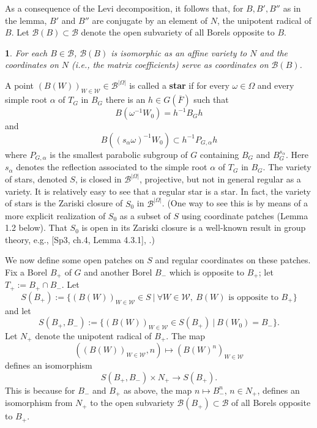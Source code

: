 \documentclass[12pt,letterpaper]{amsart}
\newcommand{\proclaimname}{}
\newtheorem*{proclaimx}{\proclaimname}
\newenvironment{proclaim}[1]%
  {\renewcommand{\proclaimname}{#1}\begin{proclaimx}}{\end{proclaimx}}
\begin{document}
As a consequence of the Levi decomposition,
it follows that, for $B, B',B''$ as in the lemma,
$B'$ and $B''$ are conjugate by an element of $N$, the unipotent radical of
$B$. Let ${\mathcal B}(B)\subset {\mathcal B}$
denote the open subvariety of all Borels
opposite to $B$.

\begin{proclaim}{Corollary 1.6} For each $B\in {\mathcal B}$, ${\mathcal B}(B)$
is isomorphic
as an affine variety to $N$ and the coordinates on $N$ (i.e., the matrix
coefficients) serve as coordinates on ${\mathcal B}(B)$.
\end{proclaim}

A point
$(B(W))_{W\in{\mathcal W}}\in {\mathcal B}^{|\Omega|}$ is called a \textbf{star}
if for every $\omega\in\Omega$ and every simple root $\alpha$
of $T_G$ in $B_G$ there is an $h\in G(\overline{F})$
such that
\[
B(\omega^{-1}W_0)=h^{-1}B_Gh
\]
and
\[
B((s_\alpha\omega)^{-1}W_0)\subset h^{-1}P_{G,\alpha} h
\]
where ${P}_{G,\alpha}$ is the smallest parabolic subgroup
of $G$ containing $B_G$ and $B_G^{s_\alpha}$.
Here $s_\alpha$ denotes the reflection associated to
the simple root $\alpha$ of $T_G$ in $B_G$. The variety of stars,
denoted $S$, is closed in ${\mathcal B}^{|\Omega |}$, projective,
but not in general regular as a variety.
It is relatively easy to see that a regular star is a star.
In fact, the variety of stars is the Zariski closure of $S_0$
in ${\mathcal B}^{|\Omega|}$. (One way to see this is by means of
a more explicit realization of $S_0$ as a subset of $S$ using
coordinate patches (Lemma 1.2 below). That $S_0$ is
open in its Zariski closure is a
well-known result in group theory, e.g.,
[Sp3, ch.4, Lemma 4.3.1], \cite[II.6, Prop. 6.7]{Bor91}.)

We now define some open patches on $S$ and regular
coordinates on these patches.
Fix a Borel $B_+$ of $G$ and another Borel $B_-$ which is
opposite to $B_+$; let $T_+:=B_+\cap B_-$. Let
\[
S(B_+):=\{(B(W))_{W\in{\mathcal W}}\in S\ |\ \forall W\in{\mathcal W},\
B(W) \text{ is opposite to }B_+\}
\]
and let
\[
S(B_+,B_-):=\{(B(W))_{W\in{\mathcal W}}\in S(B_+)\
|\ B(W_0)=B_-\}.
\]
Let $N_+$ denote the unipotent radical of $B_+$. The map
\[
((B(W))_{W\in{\mathcal W}},n)\longmapsto (B(W)^n)_{W\in{\mathcal W}}
\]
defines an isomorphism
\[
S(B_+,B_-)\times N_+ \rightarrow S(B_+).
\tag{1.7}
\]
This is because for $B_-$ and $B_+$ as above, the map
$n\longmapsto B_-^n$, $n\in N_+$, defines an isomorphism from
$N_+$ to the open subvariety ${\mathcal B}(B_+)\subset {\mathcal B}$
of all Borels opposite to $B_+$.
\end{document}
